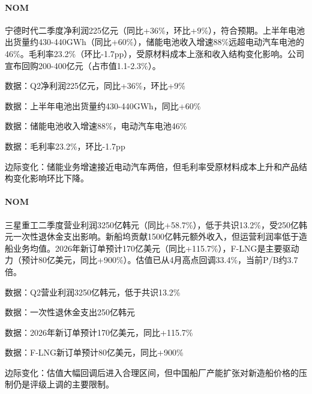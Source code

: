 \documentclass[11pt]{ctexart}
\begin{document}
\paragraph{NOM} 宁德时代二季度净利润225亿元（同比+36\%，环比+9\%），符合预期。上半年电池出货量约430-440GWh（同比+60\%），储能电池收入增速88\%远超电动汽车电池的46\%。毛利率23.2\%（环比-1.7pp），受原材料成本上涨和收入结构变化影响。公司宣布回购200-400亿元（占市值1.1-2.3\%）。
{\small\color{refgray}数据：Q2净利润225亿元，同比+36\%，环比+9\%\par}
{\small\color{refgray}数据：上半年电池出货量约430-440GWh，同比+60\%\par}
{\small\color{refgray}数据：储能电池收入增速88\%，电动汽车电池46\%\par}
{\small\color{refgray}数据：毛利率23.2\%，环比-1.7pp\par}
{\small\color{refgray}边际变化：储能业务增速接近电动汽车两倍，但毛利率受原材料成本上升和产品结构变化影响环比下降。\par}
\paragraph{NOM} 三星重工二季度营业利润3250亿韩元（同比+58.7\%），低于共识13.2\%，受250亿韩元一次性退休金支出影响。新船坞贡献1500亿韩元额外收入，但运营利润率低于造船业务均值。2026年新订单预计170亿美元（同比+115.7\%），F-LNG是主要驱动力（预计80亿美元，同比+900\%）。估值已从4月高点回调33.4\%，当前P/B约3.7倍。
{\small\color{refgray}数据：Q2营业利润3250亿韩元，低于共识13.2\%\par}
{\small\color{refgray}数据：一次性退休金支出250亿韩元\par}
{\small\color{refgray}数据：2026年新订单预计170亿美元，同比+115.7\%\par}
{\small\color{refgray}数据：F-LNG新订单预计80亿美元，同比+900\%\par}
{\small\color{refgray}边际变化：估值大幅回调后进入合理区间，但中国船厂产能扩张对新造船价格的压制仍是评级上调的主要限制。\par}
\end{document}
